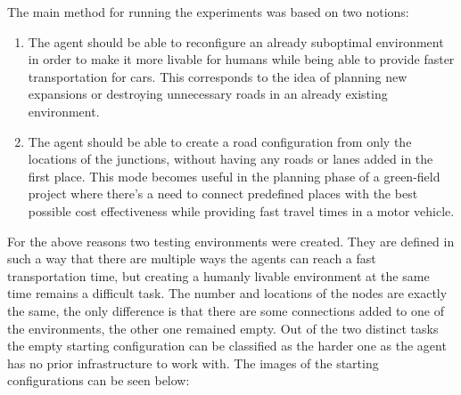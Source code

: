 \documentclass[
]{elteikthesis}[2023/04/10]
\begin{document}
The main method for running the experiments was based on two notions: 
\begin{enumerate}
\item The agent should be able to reconfigure an already suboptimal environment
in order to make it more livable for humans while being able to provide
faster transportation for cars. This corresponds to the idea of planning
new expansions or destroying unnecessary roads in an already existing
environment.
\item The agent should be able to create a road configuration from only
the locations of the junctions, without having any roads or lanes
added in the first place. This mode becomes useful in the planning
phase of a green-field project where there's a need to connect predefined
places with the best possible cost effectiveness while providing fast
travel times in a motor vehicle. 
\end{enumerate}
For the above reasons two testing environments were created. They
are defined in such a way that there are multiple ways the agents
can reach a fast transportation time, but creating a humanly livable
environment at the same time remains a difficult task. The number and locations
of the nodes are exactly the same, the only difference is that there
are some connections added to one of the environments, the other one
remained empty. Out of the two distinct tasks the empty starting configuration 
can be classified as the harder one as the agent has no prior infrastructure to work
with. The images of the starting configurations can be seen below: 
\end{document}
